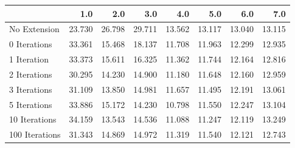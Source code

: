 \begin{tabular}{lrrrrrrr}
\toprule
{} &    1.0 &    2.0 &    3.0 &    4.0 &    5.0 &    6.0 &    7.0 \\
\midrule
No Extension   & 23.730 & 26.798 & 29.711 & 13.562 & 13.117 & 13.040 & 13.115 \\
0 Iterations   & 33.361 & 15.468 & 18.137 & 11.708 & 11.963 & 12.299 & 12.935 \\
1 Iteration    & 33.373 & 15.611 & 16.325 & 11.362 & 11.744 & 12.164 & 12.816 \\
2 Iterations   & 30.295 & 14.230 & 14.900 & 11.180 & 11.648 & 12.160 & 12.959 \\
3 Iterations   & 31.109 & 13.850 & 14.981 & 11.657 & 11.495 & 12.191 & 13.061 \\
5 Iterations   & 33.886 & 15.172 & 14.230 & 10.798 & 11.550 & 12.247 & 13.104 \\
10 Iterations  & 34.159 & 13.543 & 14.536 & 11.088 & 11.247 & 12.119 & 13.249 \\
100 Iterations & 31.343 & 14.869 & 14.972 & 11.319 & 11.540 & 12.121 & 12.743 \\
\bottomrule
\end{tabular}
